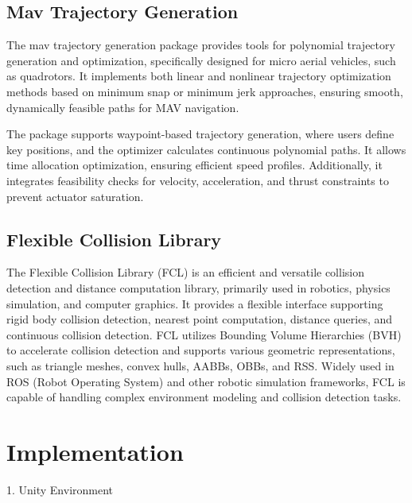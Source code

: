 \documentclass{article}
\begin{document}
\subsection{Mav Trajectory Generation}
The mav trajectory generation\cite{richter2016polynomial} package provides tools for
polynomial trajectory generation and optimization, specifically designed for micro aerial vehicles, such as quadrotors.
It implements both linear and nonlinear trajectory optimization methods based on minimum snap or minimum jerk approaches, ensuring smooth, dynamically feasible paths for MAV navigation.

The package supports waypoint-based trajectory generation, where users define key positions, and the optimizer calculates continuous polynomial paths. It allows time allocation optimization, ensuring efficient speed profiles. Additionally, it integrates feasibility checks for velocity, acceleration, and thrust constraints to prevent actuator saturation.


\subsection{Flexible Collision Library}
The Flexible Collision Library\cite{6225337} (FCL) is an efficient and versatile collision detection and distance computation library, primarily used in robotics, physics simulation, and computer graphics. It provides a flexible interface supporting rigid body collision detection, nearest point computation, distance queries, and continuous collision detection. FCL utilizes Bounding Volume Hierarchies (BVH) to accelerate collision detection and supports various geometric representations, such as triangle meshes, convex hulls, AABBs, OBBs, and RSS. Widely used in ROS (Robot Operating System) and other robotic simulation frameworks, FCL is capable of handling complex environment modeling and collision detection tasks.

\section{Implementation}

1. Unity Environment
\end{document}
